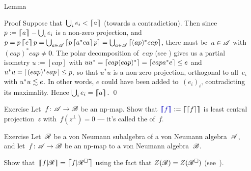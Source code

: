 \documentclass[a]{subfiles}
\begin{document}
\begin{parsec}
\begin{point}{Lemma}
\begin{point}{Proof}
Suppose that~$\bigcup_i e_i < \left\lceil\!\!\left\lceil a\right\rceil\!\!\right\rceil$
(towards a contradiction).
Then since $p:=\left\lceil\!\!\left\lceil a\right\rceil\!\!\right\rceil-\bigcup_i e_i $ 
is a non-zero projection,
and~$p=p\left\lceil\!\!\left\lceil e\right\rceil\!\!\right\rceil p
=\bigcup_{a\in\mathscr{A}} \left\lceil p\left\lceil a^*ea\right\rceil p\right\rceil
= \bigcup_{a\in\mathscr{A}} \left\lceil(ap)^*eap\right\rceil$,
there must be~$a\in\mathscr{A}$ with $(eap)^*eap\neq 0$.
The polar decomposition of~$eap$
(see \TODO{})
gives us a partial isometry $u:=[eap]$
with $uu^* = \left\lceil eap(eap)^*\right\rceil=\left\lceil eapa^*e\right\rceil\leq e$
and $u^*u= \left\lceil(eap)^*eap\right\rceil\leq p$,
so that $u^*u$ is a non-zero projection,
orthogonal to all~$e_i$ with $u^*u \vmleq e$.
In other words,
$e$ could have been added to~$(e_i)_i$,
contradicting its maximality.
Hence $\bigcup_i e_i = \left\lceil\!\!\left\lceil a\right\rceil\!\!\right\rceil$.
\qed
\end{point}
\end{point}
\begin{point}{Exercise}%
Let~$f\colon \mathscr{A} \to \mathscr{B}$ be an np-map.
Show that $\Define{\cceil{f}}:=\cceil{\ceil{f}}$ is least central projection~$z$
with~$f(z^\perp)=0$
--- it's called the 
 of~$f$.
\end{point}
\begin{point}{Exercise}%
Let~$\mathscr{R}$ be a von Neumann subalgebra of a von Neumann algebra~$\mathscr{A}$,
and let~$f\colon \mathscr{A}\to\mathscr{B}$ be an np-map
to a von Neumann algebra~$\mathscr{B}$.

Show that~$\cceil{f|\scrR}=\cceil{f|\scrR^\square}$
using the fact that $Z(\mathscr{R})=Z(\mathscr{R}^\square)$
(see~).
\end{point}
\end{parsec}%
\end{document}
